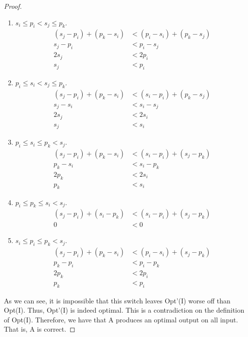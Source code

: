\documentclass{article}
\begin{document}
\begin{enumerate}[label=(\alph*)]
\begin{proof}
\begin{enumerate}[label=Case \arabic*.]
                \item $ s_i \leq p_i < s_j \leq p_k $.
                \begin{align*}
                    (s_j - p_i) + (p_k - s_i) &< (p_i - s_i) + (p_k - s_j)\\
                    s_j - p_i &< p_i - s_j\\
                    2s_j &< 2p_i\\
                    s_j &< p_i
                \end{align*}

                \item $ p_i \leq s_i < s_j \leq p_k $.
                \begin{align*}
                    (s_j - p_i) + (p_k - s_i) &< (s_i - p_i) + (p_k - s_j)\\
                    s_j - s_i &< s_i - s_j\\
                    2s_j &< 2s_i\\
                    s_j &< s_i
                \end{align*}

                \item $ p_i \leq s_i \leq p_k < s_j $.
                \begin{align*}
                    (s_j - p_i) + (p_k - s_i) &< (s_i - p_i) + (s_j - p_k)\\
                    p_k - s_i &< s_i - p_k\\
                    2p_k &< 2s_i\\
                    p_k &< s_i
                \end{align*}

                \item $ p_i \leq p_k \leq s_i < s_j $.
                \begin{align*}
                    (s_j - p_i) + (s_i - p_k) &< (s_i - p_i) + (s_j - p_k)\\
                    0 &< 0
                \end{align*}

                \item $ s_i \leq p_i \leq p_k < s_j $.
                \begin{align*}
                    (s_j - p_i) + (p_k - s_i) &< (p_i - s_i) + (s_j - p_k)\\
                    p_k - p_i &< p_i - p_k\\
                    2p_k &< 2p_i\\
                    p_k &< p_i
                \end{align*}
            \end{enumerate}

            As we can see, it is impossible that this switch leaves Opt'(I) worse off than Opt(I).
            Thus, Opt'(I) is indeed optimal.
            This is a contradiction on the definition of Opt(I).
            Therefore, we have that A produces an optimal output on all input.
            That is, A is correct.
        \end{proof}
    \end{enumerate}
\end{document}
